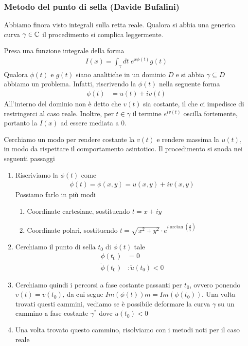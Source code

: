 \subsubsection{Metodo del punto di sella (Davide Bufalini)}

Abbiamo finora visto integrali sulla retta reale. Qualora si abbia una generica curva $\gamma \in \mathbb{C}$ il procedimento si complica leggermente. 

Presa una funzione integrale della forma
\begin{align}
	I(x) = \int_\gamma dt \; e^{x\phi(t)} g(t)
\end{align}
Qualora $\phi(t)$ e $g(t)$ siano analitiche in un dominio $\mathit{D}$ e si abbia $\gamma \subseteq \mathit{D}$ abbiamo un problema. Infatti, riscrivendo la $\phi(t)$ nella seguente forma
\begin{align}
	\phi(t) &= u(t) + iv(t)
\end{align}
All'interno del dominio non è detto che $v(t)$ sia costante, il che ci impedisce di restringerci al caso reale. Inoltre, per $t \in \gamma$ il termine $e^{iv(t)}$ oscilla fortemente, portanto la $I(x)$ ad essere mediata a 0. 

Cerchiamo un modo per rendere costante la $v(t)$ e rendere massima la $u(t)$, in modo da rispettare il comportamento asintotico.
Il procedimento si snoda nei seguenti passaggi
\begin{enumerate}
	\item Riscriviamo la $\phi(t)$ come
	\begin{align}
		\phi(t) = \phi(x,y) = u(x,y) + iv(x,y)
	\end{align}
	Possiamo farlo in più modi
	\begin{enumerate}
		\item Coordinate cartesiane, sostituendo $t = x + iy$
		\item Coordinate polari, sostituendo $t = \sqrt{x^2 + y^2}\cdot e^{i \arctan \left(\frac{x}{y}\right)}$
	\end{enumerate}
	\item Cerchiamo il punto di sella $t_0$ di $\phi(t)$ tale
	\begin{align}
		\phi(t_0) &= 0 \\
		\ddot{\phi}(t_0) &: \ddot{u}(t_0) <0 
	\end{align}
	\item Cerchiamo quindi i percorsi a fase costante passanti per $t_0$, ovvero ponendo $v(t)= v(t_0)$, da cui segue $Im(\phi(t)) m= Im(\phi(t_0))$. Una volta trovati questi cammini, vediamo se è possibile deformare la curva $\gamma$ su un cammino a fase costante $\gamma^*$ dove $\ddot{u}(t_0) <0$  
	\item Una volta trovato questo cammino, risolviamo con i metodi noti per il caso reale
	
\end{enumerate}

